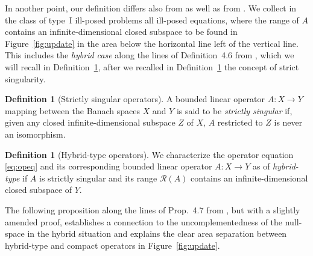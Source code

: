 \documentclass[12pt,twoside,reqno]{amsart}
\theoremstyle{definition}
\newtheorem{definition}[theorem]{Definition}
\numberwithin{equation}{section}
\begin{document}
In another point, our definition differs also from \cite{Nashed86} as well as from \cite[Def.~4.1]{HofKin25}. We collect in the class of type~I ill-posed problems all ill-posed equations, where the range of $A$ contains an infinite-dimensional closed subspace to be found in Figure~\ref{fig:update} in the area below the horizontal line left of the vertical line. This includes the \emph{hybrid case} along the lines of Definition~4.6 from \cite{HofKin25}, which we will recall in Definition~\ref{def:hybrid}, after we recalled in Definition~\ref{def:ss} the concept of strict singularity.

\begin{definition}[Strictly singular operators] \label{def:ss}
A bounded linear operator $A: X \to Y$ mapping between the Banach spaces $X$ and $Y$  is said to be \emph{strictly singular} if,
given any closed infinite-dimensional subspace $Z$ of $X$, $A$ restricted to $Z$ is
never an isomorphism.
\end{definition}


\begin{definition}[Hybrid-type operators] \label{def:hybrid}
We characterize the operator equation \eqref{eq:opeq} and its corresponding bounded linear operator $A: X \to Y$  as of \emph{hybrid-type} if $A$ is strictly singular and its range $\mathcal{R}(A)$ contains an infinite-dimensional closed subspace of $Y$.
\end{definition}

The following proposition along the lines of Prop.~4.7 from \cite{HofKin25}, but with a slightly amended proof, establishes a connection to the uncomplementedness of the null-space in the hybrid situation and explains the clear area separation between hybrid-type and compact operators in  Figure~\ref{fig:update}.
\end{document}

